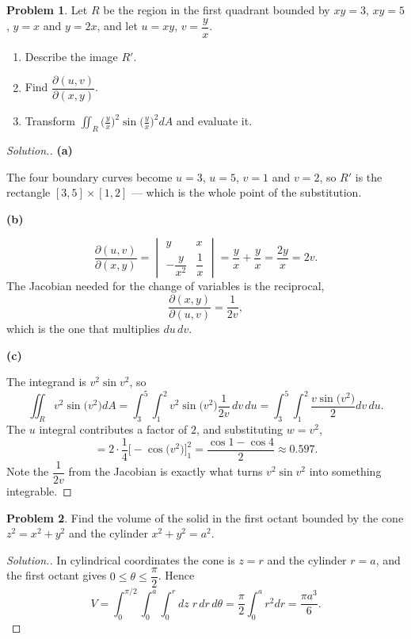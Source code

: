 \documentclass[11pt,a4paper]{article}
\theoremstyle{definition}
\newtheorem{problemx}{Problem}[subsection]
\newenvironment{problem}{\begin{problemx}}{\end{problemx}}
\newenvironment{solution}
  {\renewcommand{\qedsymbol}{}\begin{proof}[\textit{Solution}.]}
  {\end{proof}}
\newcommand{\subhead}[1]{%
  \par\medskip\noindent\textbf{#1}\par\nobreak\smallskip}
\begin{document}
\begin{problem}
Let $R$ be the region in the first quadrant bounded by $xy=3$, $xy=5$, $y=x$
and $y=2x$, and let $u = xy$, $v = \dfrac{y}{x}$.
\begin{enumerate}
\item[(a)] Describe the image $R'$.
\item[(b)] Find $\dfrac{\partial(u,v)}{\partial(x,y)}$.
\item[(c)] Transform
$\displaystyle{\iint_R\Big(\frac{y}{x}\Big)^2\sin\Big(\frac yx\Big)^2dA}$ and
evaluate it.
\end{enumerate}
\end{problem}
\begin{solution}
\subhead{(a)}
The four boundary curves become $u=3$, $u=5$, $v=1$ and $v=2$, so $R'$ is the
rectangle $[3,5]\times[1,2]$ --- which is the whole point of the substitution.

\subhead{(b)}
$$\frac{\partial(u,v)}{\partial(x,y)}
= \begin{vmatrix} y & x\\ -\dfrac{y}{x^2} & \dfrac1x\end{vmatrix}
= \frac{y}{x} + \frac{y}{x} = \frac{2y}{x} = 2v .$$
The Jacobian needed for the change of variables is the reciprocal,
$$\frac{\partial(x,y)}{\partial(u,v)} = \frac{1}{2v},$$
which is the one that multiplies $du\,dv$.

\subhead{(c)}
The integrand is $v^2\sin v^2$, so
$$\iint_R v^2\sin\big(v^2\big)dA
= \int_3^5\int_1^2 v^2\sin\big(v^2\big)\frac{1}{2v}\,dv\,du
= \int_3^5\int_1^2\frac{v\sin\big(v^2\big)}{2}dv\,du .$$
The $u$ integral contributes a factor of $2$, and substituting $w = v^2$,
$$= 2\cdot\frac14\Big[-\cos\big(v^2\big)\Big]_1^2
= \frac{\cos 1 - \cos 4}{2}\approx 0.597 .$$
Note the $\dfrac{1}{2v}$ from the Jacobian is exactly what turns
$v^2\sin v^2$ into something integrable.
\end{solution}

\begin{problem}
Find the volume of the solid in the first octant bounded by the cone
$z^2 = x^2+y^2$ and the cylinder $x^2+y^2 = a^2$.
\end{problem}
\begin{solution}
In cylindrical coordinates the cone is $z=r$ and the cylinder $r=a$, and the
first octant gives $0\leq\theta\leq\dfrac{\pi}{2}$. Hence
$$V = \int_0^{\pi/2}\int_0^a\int_0^r dz\;r\,dr\,d\theta
= \frac{\pi}{2}\int_0^a r^2dr = \frac{\pi a^3}{6}.$$
\end{solution}
\end{document}
